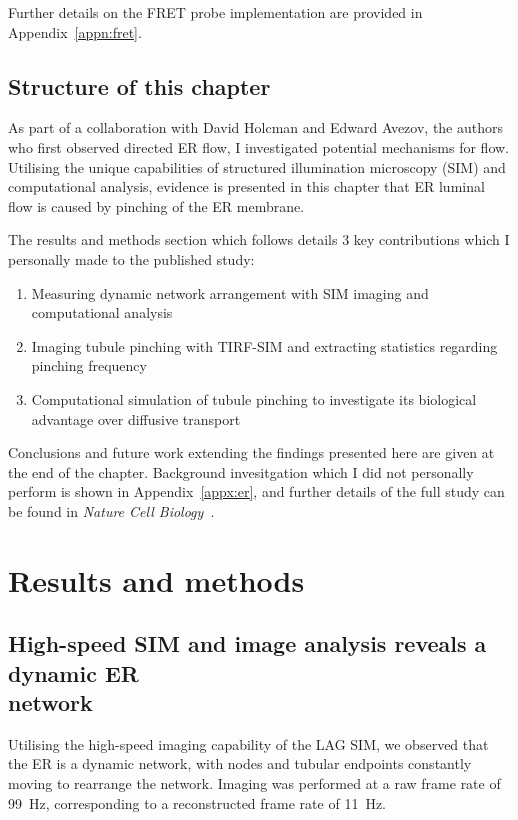 Further details on the FRET probe implementation are provided in Appendix~\ref{appn:fret}. 

\subsection{Structure of this chapter}
As part of a collaboration with David Holcman and Edward Avezov, the authors who first observed directed ER flow, I investigated potential mechanisms for flow.
Utilising the unique capabilities of structured illumination microscopy (SIM) and computational analysis, evidence is presented in this chapter that ER luminal flow is caused by pinching of the ER membrane.

The results and methods section which follows details 3 key contributions which I personally made to the published study:
\begin{enumerate}
	\item Measuring dynamic network arrangement with SIM imaging and computational analysis
	\item Imaging tubule pinching with TIRF-SIM and extracting statistics regarding pinching frequency
	\item Computational simulation of tubule pinching to investigate its biological advantage over diffusive transport
\end{enumerate}

Conclusions and future work extending the findings presented here are given at the end of the chapter.
Background invesitgation which I did not personally perform is shown in Appendix~\ref{appx:er}, and further details of the full study can be found in \textit{Nature Cell Biology}~\cite{holcman2018single}.

\section{Results and methods} \label{sec:ERresults}
\subsection[High-speed SIM and image analysis reveals a dynamic ER network]{High-speed SIM and image analysis reveals a dynamic ER\\ network} \label{sec:ERnetwork}
Utilising the high-speed imaging capability of the LAG SIM, we  observed that the ER is a dynamic network, with nodes and tubular endpoints constantly moving to rearrange the network.
Imaging was performed at a raw frame rate of \SI{99}{\hertz}, corresponding to a reconstructed frame rate of \SI{11}{\hertz}.

